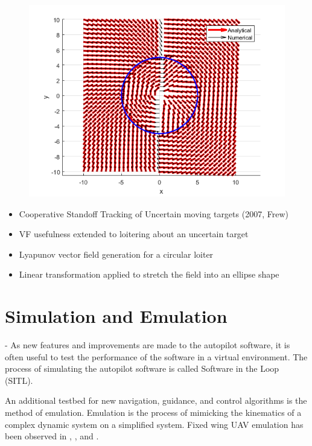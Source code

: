 \documentclass[numbered,pdftex]{ohio-etd}
\begin{document}
\begin{figure}[h]
	\centering
	\includegraphics[width=0.7\linewidth]{PaperFigures/total}
	\caption{}
	\label{fig:total}
\end{figure}

\begin{itemize}
	\item Cooperative Standoff Tracking of Uncertain moving targets (2007, Frew)
	\item VF usefulness extended to loitering about an uncertain target
	\item Lyapunov vector field generation for a circular loiter
	\item Linear transformation applied to stretch the field into an ellipse shape
\end{itemize}




\section{Simulation and Emulation}
- As new features and improvements are made to the autopilot software, it is often useful to test the performance of the software in a virtual environment. The process of simulating the autopilot software is called Software in the Loop (SITL).

An additional testbed for new navigation, guidance, and control algorithms is the method of emulation. Emulation is the process of mimicking the kinematics of a complex dynamic system on a simplified system. Fixed wing UAV emulation has been observed in \cite{louali_designing_2014}, \cite{ren_experimental_2007}, and \cite{louali_experimental_2016}.

\end{document}
